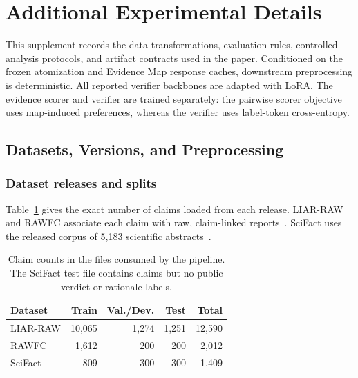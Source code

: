 \providecommand{\placeholder}[1]{\textbf{[TODO--AUTHOR: #1]}}

\section{Additional Experimental Details}
\label{sec:supp-experiments}

This supplement records the data transformations, evaluation rules,
controlled-analysis protocols, and artifact contracts used in the paper.
Conditioned on the frozen atomization and Evidence Map response caches,
downstream preprocessing is deterministic.  All reported verifier backbones
are adapted with LoRA.  The evidence scorer and verifier are trained
separately: the pairwise scorer objective uses map-induced preferences,
whereas the verifier uses label-token cross-entropy.

\subsection{Datasets, Versions, and Preprocessing}
\label{sec:supp-data}

\subsubsection{Dataset releases and splits}

Table~\ref{tab:supp-dataset-splits} gives the exact number of claims loaded
from each release.  LIAR-RAW and RAWFC associate each claim with raw,
claim-linked reports~\citep{Yang2022CofCED}.  SciFact uses the released
corpus of 5,183 scientific abstracts~\citep{Wadden2020SciFact}.

\begin{table}[t]
\centering
\scriptsize
\setlength{\tabcolsep}{2.5pt}
\begin{tabular}{lrrrr}
\toprule
\textbf{Dataset} & \textbf{Train} & \textbf{Val./Dev.}
& \textbf{Test} & \textbf{Total} \\
\midrule
LIAR-RAW & 10,065 & 1,274 & 1,251 & 12,590 \\
RAWFC    & 1,612  & 200   & 200   & 2,012 \\
SciFact  & 809    & 300   & 300   & 1,409 \\
\bottomrule
\end{tabular}
\caption{Claim counts in the files consumed by the pipeline.  The SciFact
test file contains claims but no public verdict or rationale labels.}
\label{tab:supp-dataset-splits}
\end{table}


